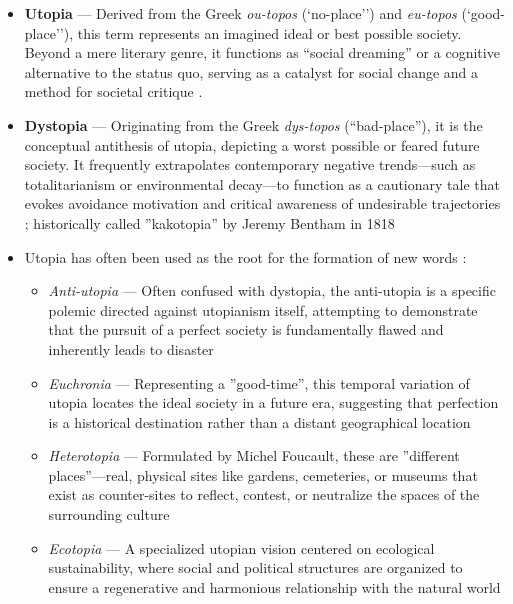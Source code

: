 \documentclass[jou,floatsintext]{apa7}
\begin{document}
\begin{itemize}
    \item \textbf{Utopia} --- Derived from the Greek \textit{ou-topos} (`no-place'') and \textit{eu-topos} (`good-place''), this term represents an imagined ideal or best possible society. Beyond a mere literary genre, it functions as ``social dreaming'' or a cognitive alternative to the status quo, serving as a catalyst for social change and a method for societal critique \parencite{levitasConceptUtopia2010, levitasUtopiaMethodImaginary2013, schoelderleGeschichteUtopieEinfuehrung2017, vieiraConceptUtopia2010}.
    \item \textbf{Dystopia} --- Originating from the Greek \textit{dys-topos} (``bad-place''), it is the conceptual antithesis of utopia, depicting a worst possible or feared future society. It frequently extrapolates contemporary negative trends—such as totalitarianism or environmental decay—to function as a cautionary tale that evokes avoidance motivation and critical awareness of undesirable trajectories \parencite{claeysOriginsDystopiaWells2010, schoelderleGeschichteUtopieEinfuehrung2017}; historically called ''kakotopia'' by Jeremy Bentham in 1818 \parencite{vieiraConceptUtopia2010}
    \item Utopia has often been used as the root for the formation of new words \parencite{claeysCambridgeCompanionUtopian2010}:
    \begin{itemize}
        \item \textit{Anti-utopia} --- Often confused with dystopia, the anti-utopia is a specific polemic directed against utopianism itself, attempting to demonstrate that the pursuit of a perfect society is fundamentally flawed and inherently leads to disaster
        \item \textit{Euchronia} --- Representing a ''good-time'', this temporal variation of utopia locates the ideal society in a future era, suggesting that perfection is a historical destination rather than a distant geographical location
        \item \textit{Heterotopia} --- Formulated by Michel Foucault, these are ''different places''---real, physical sites like gardens, cemeteries, or museums that exist as counter-sites to reflect, contest, or neutralize the spaces of the surrounding culture
        \item \textit{Ecotopia} --- A specialized utopian vision centered on ecological sustainability, where social and political structures are organized to ensure a regenerative and harmonious relationship with the natural world

\end{itemize}
\end{itemize}
\end{document}
